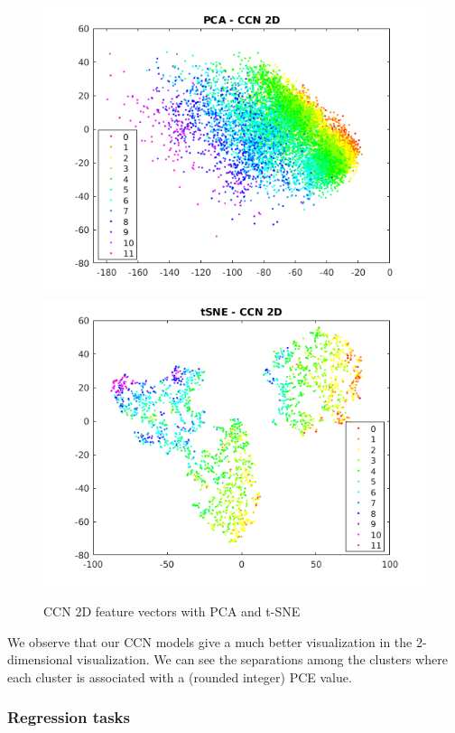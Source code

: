 \documentclass[a4paper]{article}
\begin{document}
\begin{figure}[h]
\caption{CCN 2D feature vectors with PCA and t-SNE}\label{fig:CCN_2D_features}
\includegraphics[width=0.49\columnwidth]{PCA_CCN_2D}
\includegraphics[width=0.49\columnwidth]{tSNE_CCN_2D}
\end{figure}
We observe that our CCN models give a much better visualization in the 2-dimensional visualization. We can see the separations among the clusters where each cluster is associated with a (rounded integer) PCE value.

\subsubsection{Regression tasks}
\end{document}
